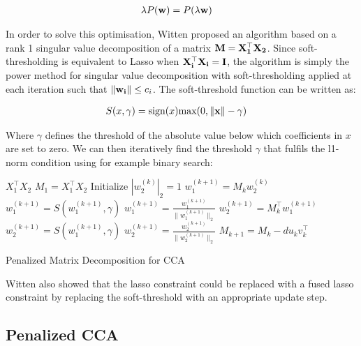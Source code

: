 \begin{align}
    & \lambda P(\bold{w})=P(\lambda \bold{w})
\end{align}

In order to solve this optimisation, Witten proposed an algorithm based on a rank 1 singular value decomposition of a matrix $\bold{M}=\bold{X_1^{\top}X_2}$. Since soft-thresholding is equivalent to Lasso when $\bold{X_i^{\top}X_i}=\bold{I}$, the algorithm is simply the power method for singular value decomposition with soft-thresholding applied at each iteration such that $\|\bold{w_i}\| \leq c_i$. The soft-threshold function can be written as:

\begin{align}
    \label{eq:softthreshold}
    & S(x,\gamma) = \text{sign}(x)\text{max}(0,\|\bold{x}\|-\gamma)
\end{align}

Where $\gamma$ defines the threshold of the absolute value below which coefficients in $x$ are set to zero. We can then iteratively find the threshold $\gamma$ that fulfils the l1-norm condition using for example binary search:

\vspace{\baselineskip}
\begin{algorithm}[H]
    \begin{algorithmic}
         $X_1^{\top}X_2$
        \STATE $M_1=X_1^{\top}X_2$
        \STATE Initialize $|w^{(k)}_2|_2=1$
        \STATE $w^{(k+1)}_1=M_kw^{(k)}_2$
        \STATE $w^{(k+1)}_1=S(w^{(k+1)}_1,\gamma)$
        \STATE $w^{(k+1)}_1=\frac{w^{(k+1)}_1}{\|w^{(k+1)}_1\|_2}$
        \STATE $w^{(k+1)}_2=M_k^{\top}w^{(k+1)}_1$
        \STATE $w^{(k+1)}_2=S(w^{(k+1)}_1,\gamma)$
        \STATE $w^{(k+1)}_2=\frac{w^{(k+1)}_2}{\|w^{(k+1)}_2\|_2}$
        \STATE $M_{k+1}=M_k-du_kv_k^{\top}$
        \ENDWHILE
        \ENDFOR
        \caption[Penalized Matrix Decomposition]{Penalized Matrix Decomposition for CCA}
    \end{algorithmic}
\end{algorithm}
\vspace{\baselineskip}

Witten also showed that the lasso constraint could be replaced with a fused lasso constraint by replacing the soft-threshold with an appropriate update step.

\subsection{Penalized CCA}

